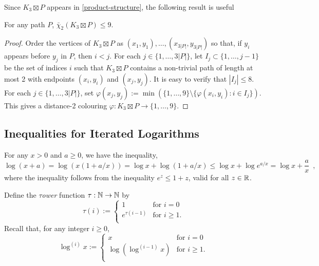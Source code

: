 \documentclass[kpfonts]{patmorin}
\newcommand{\dtcn}{\bar{\chi}_2}
\theoremstyle{named}
\begin{document}
Since $K_3\boxtimes P$ appears in \cref{product-structure}, the following result
is useful

\begin{lem}\label{dumb}
    For any path $P$, $\dtcn(K_3\boxtimes P)\le 9$.
\end{lem}

\begin{proof}
    Order the vertices of $K_3\boxtimes P$ as $(x_1,y_1),\ldots,(x_{3|P|},y_{3|P|})$ so that, if $y_i$ appears before $y_j$ in $P$, then $i<j$. For each $j\in\{1,\ldots,3|P|\}$, let $I_j\subset\{1,\ldots,j-1\}$ be the set of indices $i$ such that $K_3\boxtimes P$ contains a non-trivial path of length at most 2 with endpoints $(x_i,y_i)$ and $(x_j,y_j)$.  It is easy to verify that $|I_j|\le 8$.  For each $j\in\{1,\ldots,3|P|\}$, set $\varphi(x_j,y_j):=\min(\{1,\ldots,9\}\setminus\{\varphi(x_i,y_i):i\in I_j\})$.  This gives a distance-2 colouring $\varphi:K_3\boxtimes P\to\{1,\ldots,9\}$.
\end{proof}


\subsection{Inequalities for Iterated Logarithms}

For any $x> 0$ and $a\ge 0$, we have the inequality,
\begin{equation}
    \log (x+a) = \log (x(1+a/x)) = \log x + \log(1+a/x) \le \log x + \log e^{a/x} = \log x + \frac{a}{x} \enspace , \label{log-x-plus-a}
\end{equation}
where the inequality follows from the inequality $e^z \le 1+z$, valid for all $z\in\mathbb{R}$.

Define the \emph{$\tau$ower} function $\tau:\mathbb{N}\to\mathbb{N}$ by
\[
  \tau(i) :=
    \begin{cases}
        1 & \text{for $i=0$} \\
        e^{\tau(i-1)} & \text{for $i\ge 1$.} \\
    \end{cases}
\]
Recall that, for any integer $i\ge 0$,
\[
    \log^{(i)} x :=
      \begin{cases}
          x & \text{for $i=0$} \\
          \log\left(\log^{(i-1)}x\right) & \text{for $i\ge 1$.} \\
      \end{cases}
\]
\end{document}
